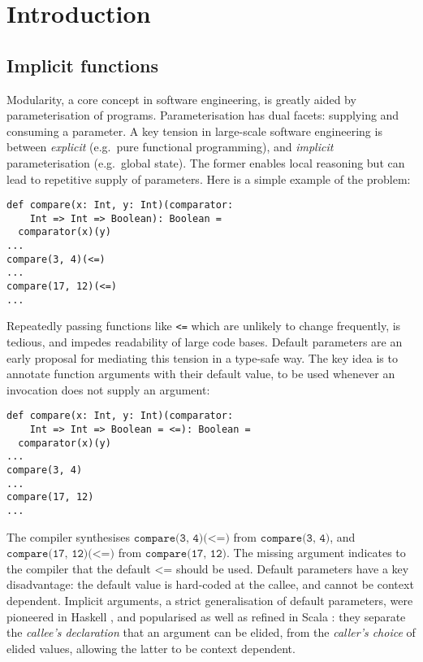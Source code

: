 \section{Introduction}

\subsection{Implicit functions}
Modularity, a core concept in software engineering, is greatly aided by
parameterisation of programs. Parameterisation has dual facets: supplying and
consuming a parameter.  A key tension in large-scale software engineering is
between \emph{explicit} (e.g.~pure functional programming), and \emph{implicit}
parameterisation (e.g.~global state).  The former enables local reasoning but
can lead to repetitive supply of parameters.  Here is a simple example of the
problem:

\begin{minipage}{\linewidth}
\begin{lstlisting}[mathescape]
def compare(x: Int, y: Int)(comparator:
    Int => Int => Boolean): Boolean =
  comparator(x)(y)
...
compare(3, 4)(<=)
...
compare(17, 12)(<=)
...
\end{lstlisting}
\end{minipage}

Repeatedly passing functions like \texttt{<=} which are unlikely to change
frequently, is tedious, and impedes readability of large code bases. Default
parameters  are an early proposal for mediating this tension in a type-safe way.
The key idea is to annotate function arguments with their default value, to be
used whenever an invocation does not supply an argument:

\begin{minipage}{\linewidth}
\begin{lstlisting}[mathescape]
def compare(x: Int, y: Int)(comparator:
    Int => Int => Boolean = <=): Boolean =
  comparator(x)(y)
...
compare(3, 4)
...
compare(17, 12)
...
\end{lstlisting}
\end{minipage}

The compiler synthesises $\texttt{compare(3, 4)(<=)}$ from $\texttt{compare(3,
4)}$, and $\texttt{compare(17, 12)(<=)}$ from $\texttt{compare(17, 12)}$. The
missing argument indicates to the compiler that the default $\texttt{<=}$ should
be used. Default parameters have a key disadvantage: the default value is
hard-coded at the callee, and cannot be context dependent. Implicit arguments, a
strict generalisation of default parameters, were pioneered in Haskell
\cite{LLMS00}, and popularised as well as refined  in Scala \cite{OBLB18}: they
separate the \emph{callee's declaration} that an argument can be elided, from
the \emph{caller's choice} of elided values, allowing the latter to be context
dependent.

